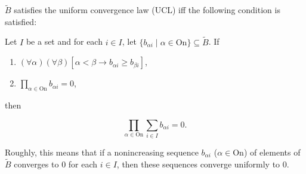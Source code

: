 $\tilde{B}$ satisfies the uniform convergence law (UCL) iff the following condition is satisfied:

Let $I$ be a set and for each $i \in I$, let $\{b_{\alpha i} \mid \alpha \in \mathrm{On}\} \subseteq \tilde{B}$. If

\begin{enumerate}
\item $(\forall \alpha)(\forall \beta)[\alpha < \beta \rightarrow b_{\alpha i} \geq b_{\beta i}]$,
\item $\prod_{\alpha \in \mathrm{On}} b_{\alpha i} = 0$,
\end{enumerate}

then

$$\prod_{\alpha \in \mathrm{On}} \sum_{i \in I} b_{\alpha i} = 0.$$

Roughly, this means that if a nonincreasing sequence $b_{\alpha i}$ ($\alpha \in \mathrm{On}$) of elements of $\tilde{B}$ converges to $0$ for each $i \in I$, then these sequences converge uniformly to $0$.$$
